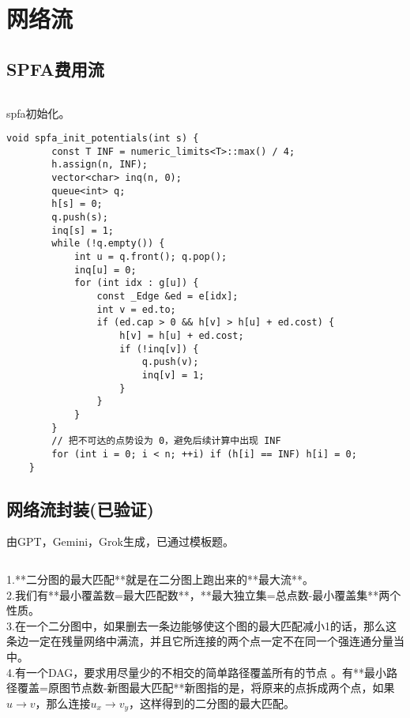 \documentclass[titlepage, a4paper]{report}
\newcommand{\cppcode}[1]{  
    \inputminted[mathescape]{cpp}{source/#1}  
}
\begin{document}
\chapter{网络流}
\section{SPFA费用流}
\cppcode{费用流.cpp}
spfa初始化。
\begin{verbatim}
void spfa_init_potentials(int s) {
        const T INF = numeric_limits<T>::max() / 4;
        h.assign(n, INF);
        vector<char> inq(n, 0);
        queue<int> q;
        h[s] = 0;
        q.push(s);
        inq[s] = 1;
        while (!q.empty()) {
            int u = q.front(); q.pop();
            inq[u] = 0;
            for (int idx : g[u]) {
                const _Edge &ed = e[idx];
                int v = ed.to;
                if (ed.cap > 0 && h[v] > h[u] + ed.cost) {
                    h[v] = h[u] + ed.cost;
                    if (!inq[v]) {
                        q.push(v);
                        inq[v] = 1;
                    }
                }
            }
        }
        // 把不可达的点势设为 0，避免后续计算中出现 INF
        for (int i = 0; i < n; ++i) if (h[i] == INF) h[i] = 0;
    }
\end{verbatim}

\section{网络流封装(已验证)}
由GPT，Gemini，Grok生成，已通过模板题。
\cppcode{网络流封装.cpp}
1.**二分图的最大匹配**就是在二分图上跑出来的**最大流**。\\
2.我们有**最小覆盖数=最大匹配数**，**最大独立集=总点数-最小覆盖集**两个性质。\\
3.在一个二分图中，如果删去一条边能够使这个图的最大匹配减小1的话，那么这条边一定在残量网络中满流，并且它所连接的两个点一定不在同一个强连通分量当中。\\
4.有一个DAG，要求用尽量少的不相交的简单路径覆盖所有的节点 。有**最小路径覆盖=原图节点数-新图最大匹配**新图指的是，将原来的点拆成两个点，如果$u \to v$，那么连接$u_x \to v_y$，这样得到的二分图的最大匹配。\\
\end{document}
